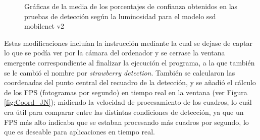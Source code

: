   \begin{figure}[H]
    \begin{center}
      \subcapcentertrue
      \hspace{4mm}
    \end{center}
    \caption{Gráficas de la media de los porcentajes de confianza obtenidos en las pruebas de detección según la luminosidad para el modelo ssd mobilenet v2}
    \label{fig:Grafica_medias_luminosidad}
  \end{figure}


Estas modificaciones incluían la instrucción mediante la cual se dejase de captar lo que se podía ver por la cámara del ordenador y se cerrase la ventana emergente correspondiente al finalizar la ejecución el programa, a la que también se le cambió el nombre por \textit{strawberry detection}. También se calcularon las coordenadas del punto central del recuadro de la detección, y se añadió el cálculo de los FPS (fotogramas por segundo) en tiempo real en la ventana (ver Figura \ref{fig:Coord_JN}); midiendo la velocidad de procesamiento de los cuadros, lo cuál era útil para comparar entre las distintas condiciones de detección, ya que un FPS más alto indicaba que se estaban procesando más cuadros por segundo, lo que es deseable para aplicaciones en tiempo real.\\ 

